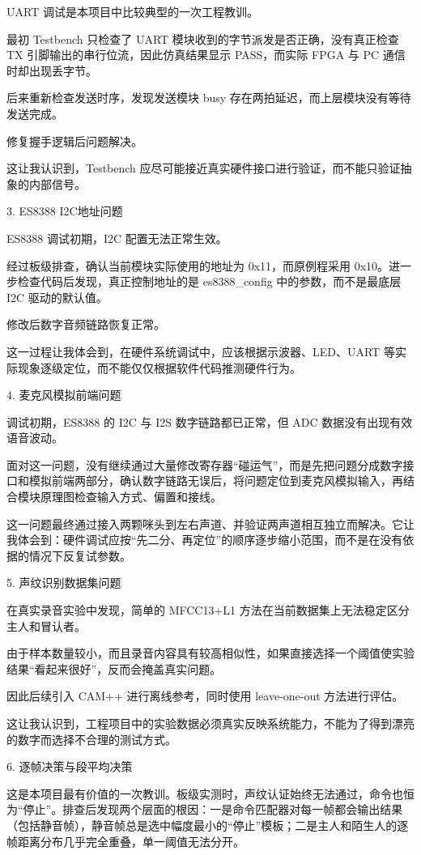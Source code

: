 \documentclass[UTF8,zihao=-4,fontset=windows]{ctexart}
\newcommand{\code}[1]{{\ttfamily #1}}
\newcommand{\subhead}[1]{%
  \par\medskip
  {\heiti\zihao{-4}#1}
  \nopagebreak
  \par\smallskip
}
\begin{document}
UART 调试是本项目中比较典型的一次工程教训。

最初 Testbench 只检查了 UART 模块收到的字节派发是否正确，没有真正检查 TX 引脚输出的串行位流，因此仿真结果显示 PASS，而实际 FPGA 与 PC 通信时却出现丢字节。

后来重新检查发送时序，发现发送模块 busy 存在两拍延迟，而上层模块没有等待发送完成。

修复握手逻辑后问题解决。

这让我认识到，Testbench 应尽可能接近真实硬件接口进行验证，而不能只验证抽象的内部信号。

\subhead{3. ES8388 I2C地址问题}

ES8388 调试初期，I2C 配置无法正常生效。

经过板级排查，确认当前模块实际使用的地址为 0x11，而原例程采用 0x10。进一步检查代码后发现，真正控制地址的是 \code{es8388\_config} 中的参数，而不是最底层 I2C 驱动的默认值。

修改后数字音频链路恢复正常。

这一过程让我体会到，在硬件系统调试中，应该根据示波器、LED、UART 等实际现象逐级定位，而不能仅仅根据软件代码推测硬件行为。

\subhead{4. 麦克风模拟前端问题}

调试初期，ES8388 的 I2C 与 I2S 数字链路都已正常，但 ADC 数据没有出现有效语音波动。

面对这一问题，没有继续通过大量修改寄存器“碰运气”，而是先把问题分成数字接口和模拟前端两部分，确认数字链路无误后，将问题定位到麦克风模拟输入，再结合模块原理图检查输入方式、偏置和接线。

这一问题最终通过接入两颗咪头到左右声道、并验证两声道相互独立而解决。它让我体会到：硬件调试应按“先二分、再定位”的顺序逐步缩小范围，而不是在没有依据的情况下反复试参数。

\subhead{5. 声纹识别数据集问题}

在真实录音实验中发现，简单的 MFCC13+L1 方法在当前数据集上无法稳定区分主人和冒认者。

由于样本数量较小，而且录音内容具有较高相似性，如果直接选择一个阈值使实验结果“看起来很好”，反而会掩盖真实问题。

因此后续引入 CAM++ 进行离线参考，同时使用 leave-one-out 方法进行评估。

这让我认识到，工程项目中的实验数据必须真实反映系统能力，不能为了得到漂亮的数字而选择不合理的测试方式。

\subhead{6. 逐帧决策与段平均决策}

这是本项目最有价值的一次教训。板级实测时，声纹认证始终无法通过，命令也恒为“停止”。排查后发现两个层面的根因：一是命令匹配器对每一帧都会输出结果（包括静音帧），静音帧总是选中幅度最小的“停止”模板；二是主人和陌生人的逐帧距离分布几乎完全重叠，单一阈值无法分开。
\end{document}
